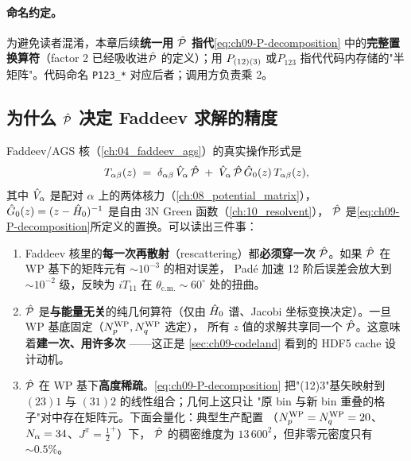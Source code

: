 \paragraph{命名约定。}
为避免读者混淆，本章后续\textbf{统一用 \(\hat{\mathcal{P}}\) 指代}\eqref{eq:ch09-P-decomposition}
中的\textbf{完整置换算符}（factor 2 已经吸收进\(\hat{\mathcal{P}}\) 的定义）；用
\(P_{(12)(3)}\) 或\(P_{123}\) 指代代码内存储的"半矩阵"。代码命名 \texttt{P123\_*}
对应后者；调用方负责乘 2。

\subsection{为什么 \texorpdfstring{$\hat{\mathcal{P}}$}{P} 决定 Faddeev 求解的精度}
\label{subsec:ch09-why-precision}

Faddeev/AGS 核（\cref{ch:04_faddeev_ags}）的真实操作形式是
\begin{equation}
\label{eq:ch09-faddeev-kernel}
T_{\alpha\beta}(z) \;=\; \delta_{\alpha\beta}\,\hat{V}_{\alpha}\,\hat{\mathcal{P}} \;+\;
\hat{V}_{\alpha}\,\hat{\mathcal{P}}\,\hat{G}_0(z)\,T_{\alpha\beta}(z),
\end{equation}
其中 \(\hat{V}_\alpha\) 是配对 \(\alpha\) 上的两体核力（\cref{ch:08_potential_matrix}），
\(\hat{G}_0(z)=(z-\hat{H}_0)^{-1}\) 是自由 3N Green 函数（\cref{ch:10_resolvent}），
\(\hat{\mathcal{P}}\) 是\eqref{eq:ch09-P-decomposition}所定义的置换。可以读出三件事：

\begin{enumerate}
\item Faddeev 核里的\textbf{每一次再散射}（rescattering）都\textbf{必须穿一次}
      \(\hat{\mathcal{P}}\)。如果 \(\hat{\mathcal{P}}\) 在 WP 基下的矩阵元有 \(\sim 10^{-3}\) 的相对误差，
      Padé 加速 12 阶后误差会放大到 \(\sim 10^{-2}\) 级，反映为 \(iT_{11}\)
      在 \(\theta_{\text{c.m.}}\sim 60^\circ\) 处的扭曲。
\item \(\hat{\mathcal{P}}\) 是\textbf{与能量无关}的纯几何算符（仅由 \(\hat{H}_0\)
      谱、Jacobi 坐标变换决定）。一旦 WP 基底固定（\({N_{p}^{\text{WP}}}, {N_{q}^{\text{WP}}}\) 选定），
      所有 \(z\) 值的求解共享同一个 \(\hat{\mathcal{P}}\)。这意味着\textbf{建一次、用许多次}
      ——这正是 \cref{sec:ch09-codeland} 看到的 HDF5 cache 设计动机。
\item \(\hat{\mathcal{P}}\) 在 WP 基下\textbf{高度稀疏}。\eqref{eq:ch09-P-decomposition}
      把"(12)3"基矢映射到 \((23)1\) 与 \((31)2\) 的线性组合；几何上这只让
      "原 bin 与新 bin 重叠的格子"对中存在矩阵元。下面会量化：典型生产配置
      （\({N_{p}^{\text{WP}}}={N_{q}^{\text{WP}}}=20\)、\(N_\alpha=34\)、\(J^\pi=\tfrac{1}{2}^+\)）下，
      \(\hat{\mathcal{P}}\) 的稠密维度为 \(13\,600^2\)，但非零元密度只有 \(\sim 0.5\%\)。
\end{enumerate}

